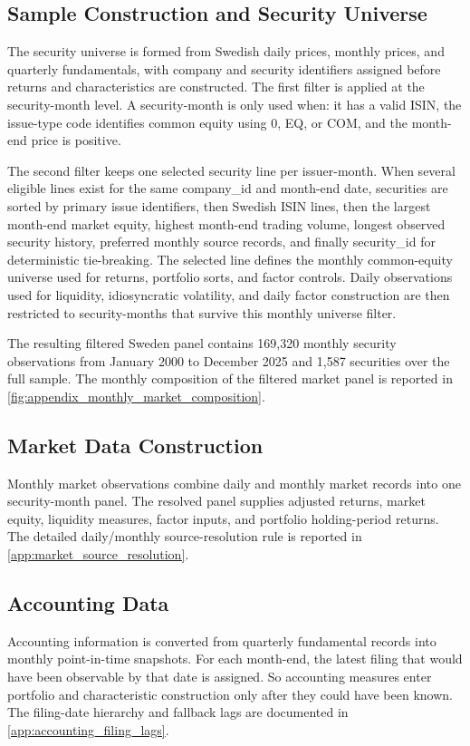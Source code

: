 \documentclass[11pt]{article}
\newcommand{\repo}[1]{\textnormal{\small #1}}
\begin{document}
\subsection{Sample Construction and Security Universe}
The security universe is formed from Swedish daily prices, monthly prices, and quarterly fundamentals, with company and security identifiers assigned before returns and characteristics are constructed. The first filter is applied at the security-month level. A security-month is only used when: it has a valid ISIN, the issue-type code identifies common equity using \repo{0}, \repo{EQ}, or \repo{COM}, and the month-end price is  positive. 

The second filter keeps one selected security line per issuer-month. When several eligible lines exist for the same \repo{company\_id} and month-end date, securities are sorted by primary issue identifiers, then Swedish ISIN lines, then the largest month-end market equity, highest month-end trading volume, longest observed security history, preferred monthly source records, and finally \repo{security\_id} for deterministic tie-breaking. The selected line defines the monthly common-equity universe used for returns, portfolio sorts, and factor controls. Daily observations used for liquidity, idiosyncratic volatility, and daily factor construction are then restricted to security-months that survive this monthly universe filter.

The resulting filtered Sweden panel contains 169,320 monthly security observations from January 2000 to December 2025 and 1,587 securities over the full sample. The monthly composition of the filtered market panel is reported in \cref{fig:appendix_monthly_market_composition}.

\subsection{Market Data Construction}
Monthly market observations combine daily and monthly market records into one security-month panel. The resolved panel supplies adjusted returns, market equity, liquidity measures, factor inputs, and portfolio holding-period returns. The detailed daily/monthly source-resolution rule is reported in \cref{app:market_source_resolution}.

\subsection{Accounting Data}
Accounting information is converted from quarterly fundamental records into monthly point-in-time snapshots. For each month-end, the latest filing that would have been observable by that date is assigned. So accounting measures enter portfolio and characteristic construction only after they could have been known. The filing-date hierarchy and fallback lags are documented in \cref{app:accounting_filing_lags}.
\end{document}
